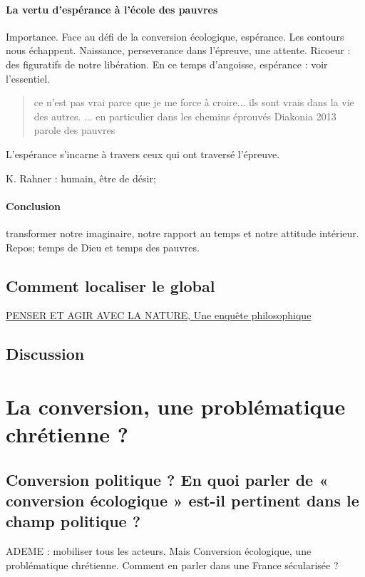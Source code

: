 \paragraph{La vertu d'espérance à l'école des pauvres} Importance. Face au défi de la conversion écologique, espérance. Les contours nous échappent. Naissance, perseverance dans l'épreuve, une attente. Ricoeur : des figuratifs de notre libération. En ce temps d'angoisse, espérance : voir l'essentiel. 

\begin{quote}
ce n'est pas vrai parce que je me force à croire... ils sont vrais dans la vie des autres. ... en particulier dans les chemins éprouvés
    Diakonia 2013 parole des pauvres
\end{quote}
L'espérance s'incarne à travers ceux qui ont traversé l'épreuve. 

K. Rahner : humain, être de désir; 

\paragraph{Conclusion}
transformer notre imaginaire, notre rapport au temps et notre attitude intérieur. Repos; temps de Dieu et temps des pauvres.


\subsection{Comment localiser le global}


\href{https://www.cairn.info/revue-projet-2015-5-page-95a.htm}{PENSER ET AGIR AVEC LA NATURE, Une enquête philosophique}
\subsection{Discussion}


\section{La conversion, une problématique chrétienne ?}


\subsection{Conversion politique ? En quoi parler de « conversion écologique » est-il pertinent dans le champ politique ?
}
ADEME : mobiliser tous les acteurs.
Mais Conversion écologique, une problématique chrétienne. Comment en parler dans une France sécularisée ?

